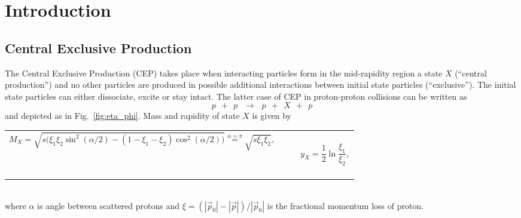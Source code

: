 

\chapter{Introduction}\label{chap:introduction}

\section{Central Exclusive Production}
The Central Exclusive Production (CEP) takes place when interacting particles form in the mid-rapidity region a state $X$ (``central production'') and no other particles are produced in possible additional interactions between initial state particles (``exclusive''). The initial state particles can either dissociate, excite or stay intact. The latter case of CEP in proton-proton collisions can be written as
\begin{equation}\label{eq:cep}%
p~~+~~p~~~\rightarrow~~~p~~+~~X~~+~~p
\end{equation}
and depicted as in Fig.~\ref{fig:eta_phi}. Mass and rapidity of state $X$ is given by\\[-10pt]
\begin{tabulary}{\textwidth}{CCR}
\begin{equation}\label{eq:mass_X}
M_{X} = \sqrt{s\Big(\xi_{1}\xi_{2}\sin^{2}{(\alpha/2)}-(1-\xi_{1}-\xi_{2})\cos^{2}{(\alpha/2)}\Big)} \stackrel{\alpha=\pi}{=} \sqrt{s\xi_{1}\xi_{2}},
\end{equation}~~~~~~~~~~~~~~~~ & ~~ & ~~~~~~
\begin{equation}\label{eq:rapidity_X}
y_{X} = \frac{1}{2}\ln{\frac{\xi_{1}}{\xi_{2}}},
\end{equation}~~~~~~~~
\end{tabulary}\\[-10pt]
where $\alpha$ is angle between scattered protons and $\xi=\left(|\vec{p}_{0}|-|\vec{p}|\right)/|\vec{p}_{0}|$ is the fractional momentum loss of proton.\vspace{-5pt}

